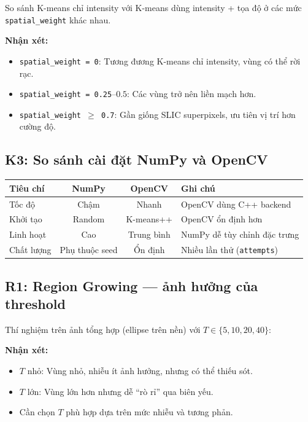 \documentclass[12pt,a4paper]{article}
\begin{document}
So sánh K-means chỉ intensity với K-means dùng intensity + tọa độ ở các mức \texttt{spatial\_weight} khác nhau.

\textbf{Nhận xét:}
\begin{itemize}
    \item \texttt{spatial\_weight = 0}: Tương đương K-means chỉ intensity, vùng có thể rời rạc.
    \item \texttt{spatial\_weight = 0.25}--$0.5$: Các vùng trở nên liền mạch hơn.
    \item \texttt{spatial\_weight $\geq$ 0.7}: Gần giống SLIC superpixels, ưu tiên vị trí hơn cường độ.
\end{itemize}

\subsection{K3: So sánh cài đặt NumPy và OpenCV}

\begin{center}
\begin{tabular}{@{}lccl@{}}
    \toprule
    \textbf{Tiêu chí} & \textbf{NumPy} & \textbf{OpenCV} & \textbf{Ghi chú} \\
    \midrule
    Tốc độ & Chậm & Nhanh & OpenCV dùng C++ backend \\
    Khởi tạo & Random & K-means++ & OpenCV ổn định hơn \\
    Linh hoạt & Cao & Trung bình & NumPy dễ tùy chỉnh đặc trưng \\
    Chất lượng & Phụ thuộc seed & Ổn định & Nhiều lần thử (\texttt{attempts}) \\
    \bottomrule
\end{tabular}
\end{center}

\subsection{R1: Region Growing --- ảnh hưởng của threshold}

Thí nghiệm trên ảnh tổng hợp (ellipse trên nền) với $T \in \{5, 10, 20, 40\}$:

\textbf{Nhận xét:}
\begin{itemize}
    \item $T$ nhỏ: Vùng nhỏ, nhiễu ít ảnh hưởng, nhưng có thể thiếu sót.
    \item $T$ lớn: Vùng lớn hơn nhưng dễ ``rò rỉ'' qua biên yếu.
    \item Cần chọn $T$ phù hợp dựa trên mức nhiễu và tương phản.
\end{itemize}
\end{document}
